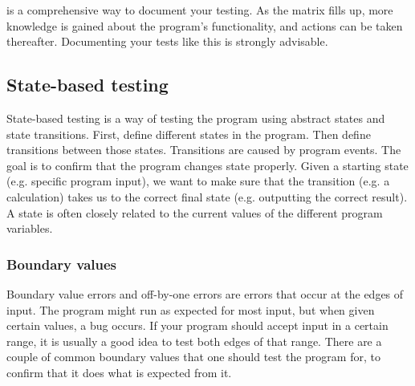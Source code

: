 \documentclass[11pt,a4paper,twoside]{article}
\begin{document}
 is a comprehensive way to document your testing. As the matrix fills up,
more knowledge is gained about the program's functionality, and actions can be
taken thereafter. Documenting your tests like this is strongly
advisable.
 

\subsection{State-based testing}

State-based testing is a way of testing the program using abstract states and state
transitions. First, define different states in the program. Then define
transitions between those states. Transitions are caused by program events. The
goal is to confirm that the program changes state properly. Given a starting
state (e.g. specific program input), we want to make sure that the transition
(e.g. a calculation) takes us to the correct final state (e.g. outputting the
correct result). A state is often closely related to the current values of the
different program variables.
 

\subsubsection{Boundary values}

Boundary value errors and off-by-one errors are errors that occur at the edges
of input. The program might run as expected for most input, but when given
certain values, a bug occurs. If your program should accept input in a certain
range, it is usually a good idea to test both edges of that range. There are a
couple of common boundary values that one should test the program for, to
confirm that it does what is expected from it.
\end{document}
